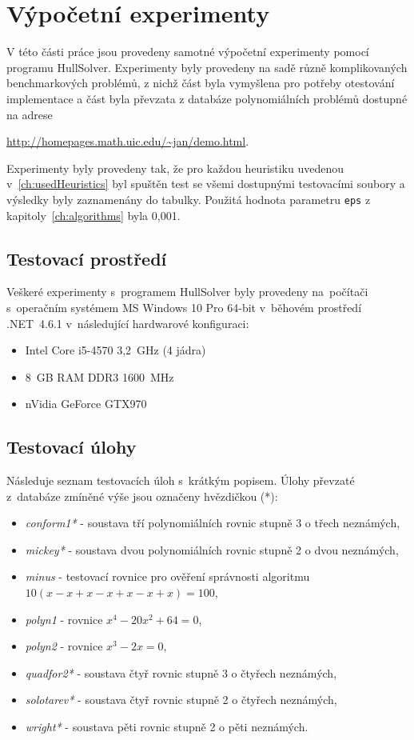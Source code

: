 


\chapter{Výpočetní experimenty}
V této části práce jsou provedeny samotné výpočetní experimenty pomocí programu HullSolver. Experimenty byly provedeny na sadě různě komplikovaných benchmarkových problémů, z nichž část byla vymyšlena pro potřeby otestování implementace a část byla převzata z databáze polynomiálních problémů dostupné na adrese {\url{http://homepages.math.uic.edu/~jan/demo.html}.

Experimenty byly provedeny tak, že pro každou heuristiku uvedenou v~\ref{ch:usedHeuristics} byl spuštěn test se všemi dostupnými testovacími soubory a výsledky byly zaznamenány do tabulky. Použitá hodnota parametru \verb|eps| z kapitoly~\ref{ch:algorithms} byla 0,001.


\section{Testovací prostředí}
Veškeré experimenty s~programem HullSolver byly provedeny na~počítači s~operačním systémem MS Windows 10 Pro 64-bit v~běhovém prostředí .NET~4.6.1 v~následující hardwarové konfiguraci:

\begin{itemize}
\item Intel Core i5-4570 3,2~GHz (4 jádra)
\item 8~GB RAM DDR3 1600~MHz
\item nVidia GeForce GTX970
\end{itemize}

\section{Testovací úlohy}

Následuje seznam testovacích úloh s~krátkým popisem. Úlohy převzaté z~databáze zmíněné výše jsou označeny hvězdičkou (*):

\begin{itemize}
    \item \emph{conform1*} - soustava tří polynomiálních rovnic stupně 3 o třech neznámých,
    \item \emph{mickey*} - soustava dvou polynomiálních rovnic stupně 2 o dvou neznámých,
    \item \emph{minus} - testovací rovnice pro ověření správnosti algoritmu $10(x - x + x - x + x - x + x) = 100$,
    \item \emph{polyn1} - rovnice $x^4 - 20x^2 + 64 = 0$,
    \item \emph{polyn2} - rovnice $x^3 - 2x = 0$,
    \item \emph{quadfor2*} - soustava čtyř rovnic stupně 3 o čtyřech neznámých,
    \item \emph{solotarev*} - soustava čtyř rovnic stupně 2 o čtyřech neznámých,
    \item \emph{wright*} - soustava pěti rovnic stupně 2 o pěti neznámých.
\end{itemize}

}
